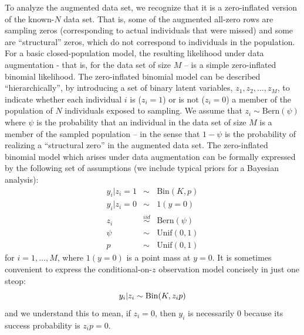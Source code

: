 To analyze the augmented data set, we recognize that it is a
zero-inflated version of the known-$N$ data set. That is, some of the
augmented all-zero rows are sampling zeros (corresponding to actual
individuals that were missed) and some are ``structural'' zeros, which
do not correspond to individuals in the population. For a basic
closed-population model, the resulting likelihood under data
augmentation - that is, for the data set of size $M$ -- is a simple
zero-inflated binomial likelihood.  The zero-inflated binomial model
can be described ``hierarchically'', by introducing a set of binary
latent variables, $z_{1},z_{2},\ldots, z_{M}$, to indicate whether
each individual $i$ is ($z_i=1$) or is not ($z_i=0$) a member of the
population of $N$ individuals exposed to sampling. We assume that
$z_{i} \sim \mbox{Bern}(\psi)$ where $\psi$ is the probability that an
individual in the data set of size $M$ is a member of the sampled
population -- in the sense that $1-\psi$ is the probability of
realizing a ``structural zero'' in the augmented data set.  The
zero-inflated binomial model which arises under data augmentation can
be formally expressed by the following set of assumptions (we include
typical priors for a Bayesian analysis):
\begin{eqnarray*}
 y_{i}|{z_{i}=1} & \sim  &\mbox{Bin}(K, p) \\
 y_{i}|{z_{i}=0} & \sim &  1(y=0)  \\
 z_{i} & \stackrel{iid}{\sim} & \mbox{Bern}(\psi) \\
 \psi & \sim & \mathrm{Unif}(0,1) \\
 p & \sim & \mathrm{Unif}(0,1)
\end{eqnarray*}
for $i=1, \ldots, M$, where $1(y=0)$ is a point mass at
$y=0$.
It is sometimes convenient to express the conditional-on-$z$
observation model concisely in
just one steop:
\[
 y_{i}|z_{i}  \sim  \mbox{Bin}(K, z_{i} p) \\
\]
and we understand this to mean, if $z_{i}=0$, then $y_{i}$ is
necessarily 0 because its success probability is $z_{i} p = 0$.


